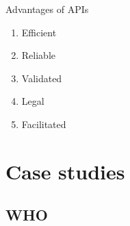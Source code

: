 \documentclass[xcolor=x11names, aspectratio=169, compress]{beamer}
\renewcommand{\(}{\begin{columns}}
\renewcommand{\)}{\end{columns}}
\newcommand{\<}[1]{\begin{column}{#1}}
\renewcommand{\>}{\end{column}}
\begin{document}
\begin{frame}{Advantages of APIs}
\pause
\begin{enumerate}[<+->]
    \item Efficient
    \item Reliable
    \item Validated
    \item Legal
    \item Facilitated
\end{enumerate}
\end{frame}

\section{Case studies}

\subsection{WHO}
\end{document}
